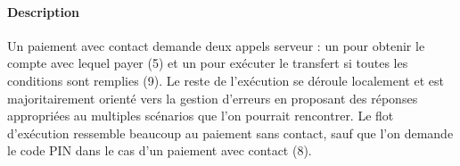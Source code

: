 \paragraph{Description} Un paiement avec contact demande deux appels serveur : un pour obtenir le compte avec lequel payer (5) et un pour exécuter le transfert si toutes les conditions sont remplies (9). Le reste de l'exécution se déroule localement et est majoritairement orienté vers la gestion d'erreurs en proposant des réponses appropriées au multiples scénarios que l'on pourrait rencontrer. Le flot d'exécution ressemble beaucoup au paiement sans contact, sauf que l'on demande le code PIN dans le cas d'un paiement avec contact (8).